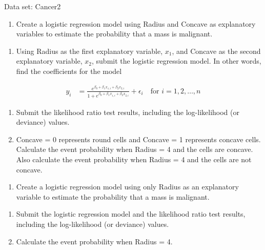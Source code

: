 \documentclass[
]{report}
\providecommand{\tightlist}{%
  \setlength{\itemsep}{0pt}\setlength{\parskip}{0pt}}
\begin{document}
Data set: Cancer2

\begin{enumerate}
\def\labelenumi{\arabic{enumi}.}
\setcounter{enumi}{14}
\tightlist
\item
  Create a logistic regression model using Radius and Concave as explanatory variables to estimate the probability that a mass is malignant.\\
\end{enumerate}

\begin{enumerate}
\def\labelenumi{\alph{enumi}.}
\tightlist
\item
  Using Radius as the first explanatory variable, \(x_1\), and Concave as the second explanatory variable, \(x_2\), submit the logistic regression model. In other words, find the coefficients for the model
\end{enumerate}

\begin{align}
   y_i &= \frac{e^{\beta_0 + \beta_1 x_{1,i} + \beta_2 x_{2,i}}}{1 + e^{\beta_0 + \beta_1 x_{1,i} + \beta_2 x_{2,i}}} + \epsilon_i \quad \text{for } i = 1,2,\dots,n
\end{align}

\begin{enumerate}
\def\labelenumi{\alph{enumi}.}
\setcounter{enumi}{1}
\tightlist
\item
  Submit the likelihood ratio test results, including the log-likelihood (or deviance) values.\\
\item
  Concave = 0 represents round cells and Concave = 1 represents concave cells. Calculate the event probability when Radius = 4 and the cells are concave. Also calculate the event probability when Radius = 4 and the cells are not concave.
\end{enumerate}

\begin{enumerate}
\def\labelenumi{\arabic{enumi}.}
\setcounter{enumi}{15}
\tightlist
\item
  Create a logistic regression model using only Radius as an explanatory variable to estimate the probability that a mass is malignant.\\
\end{enumerate}

\begin{enumerate}
\def\labelenumi{\alph{enumi}.}
\tightlist
\item
  Submit the logistic regression model and the likelihood ratio test results, including the log-likelihood (or deviance) values.\\
\item
  Calculate the event probability when Radius = 4.
\end{enumerate}
\end{document}
